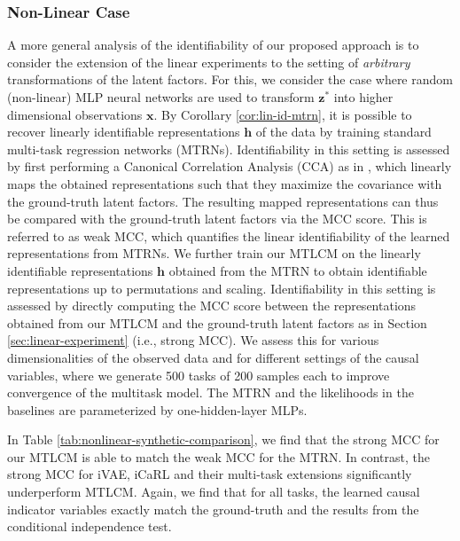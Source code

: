 \documentclass{article} %
\theoremstyle{plain}
\theoremstyle{definition}
\theoremstyle{remark}
\begin{document}
\subsubsection{Non-Linear Case}\label{sec:nonlinear-experiment}
\vspace{-0.75ex}
A more general analysis of the identifiability of our proposed approach is to consider the extension of the linear experiments to the setting of \textit{arbitrary} transformations of the latent factors. For this, we consider the case where random (non-linear) MLP neural networks are used to transform $\mathbf{z}^*$ into higher dimensional observations $\mathbf{x}$.
By Corollary \ref{cor:lin-id-mtrn}, it is possible to recover linearly identifiable representations $\mathbf{h}$ of the data by training standard multi-task regression networks (MTRNs). Identifiability in this setting is assessed by first 
performing a Canonical Correlation Analysis (CCA) as in \citet{Roeder_Metz_Kingma_2021}, which linearly maps the obtained representations such that they maximize the covariance with the ground-truth latent factors. The resulting mapped representations can thus be 
compared with the ground-truth latent factors via the MCC score. 
This is referred to as weak MCC, which quantifies the linear identifiability of the learned representations from MTRNs.
We further train our MTLCM on the linearly identifiable representations $\mathbf{h}$ obtained from the MTRN to obtain identifiable representations up to permutations and scaling. Identifiability in this setting is assessed by directly computing the MCC score between the representations obtained from our MTLCM and the ground-truth latent factors as in Section \ref{sec:linear-experiment} (i.e., strong MCC).
We assess this for various dimensionalities of the observed data
and for different settings of the causal variables, where we generate 500 tasks of 200 samples each to improve convergence of the multitask model. 
The MTRN and the likelihoods in the baselines are parameterized by one-hidden-layer MLPs.

In Table \ref{tab:nonlinear-synthetic-comparison}, we find that the strong MCC for our MTLCM is able to match the weak MCC for the MTRN.
In contrast, the strong MCC for iVAE, iCaRL and their multi-task extensions significantly underperform MTLCM. Again, we find that for all tasks, the learned causal indicator variables exactly match the ground-truth and the  results from the conditional independence test.
\end{document}
